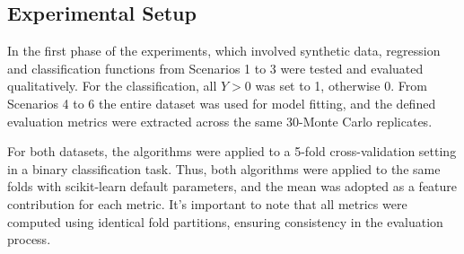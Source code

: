 \subsection{Experimental Setup}

In the first phase of the experiments, which involved synthetic data,  regression and classification functions from Scenarios 1 to 3 were tested and evaluated qualitatively. For the classification, all \(Y>0\) was set to 1, otherwise 0. From Scenarios 4 to 6 the entire dataset was used for model fitting, and the defined evaluation metrics were extracted across the same 30-Monte Carlo replicates. 

For both datasets, the algorithms were applied to a 5-fold cross-validation setting in a binary classification task. Thus, both algorithms were applied to the same folds with scikit-learn default parameters, and the mean was adopted as a feature contribution for each metric. It's important to note that all metrics were computed using identical fold partitions, ensuring consistency in the evaluation process.